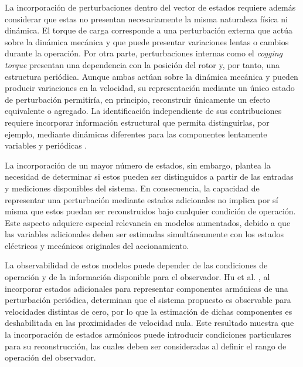 
La incorporación de perturbaciones dentro del vector de estados requiere además considerar que estas no presentan necesariamente la misma naturaleza física ni dinámica. El torque de carga corresponde a una perturbación externa que actúa sobre la dinámica mecánica y que puede presentar variaciones lentas o cambios durante la operación. Por otra parte, perturbaciones internas como el \textit{cogging torque} presentan una dependencia con la posición del rotor y, por tanto, una estructura periódica. Aunque ambas actúan sobre la dinámica mecánica y pueden producir variaciones en la velocidad, su representación mediante un único estado de perturbación permitiría, en principio, reconstruir únicamente un efecto equivalente o agregado. La identificación independiente de sus contribuciones requiere incorporar información estructural que permita distinguirlas, por ejemplo, mediante dinámicas diferentes para las componentes lentamente variables y periódicas \cite{janiszewskiExtendedKalmanFilter,huSelectivePeriodicDisturbance2022}.



La incorporación de un mayor número de estados, sin embargo, plantea la necesidad de determinar si estos pueden ser distinguidos a partir de las entradas y mediciones disponibles del sistema. En consecuencia, la capacidad de representar una perturbación mediante estados adicionales no implica por sí misma que estos puedan ser reconstruidos bajo cualquier condición de operación. Este aspecto adquiere especial relevancia en modelos aumentados, debido a que las variables adicionales deben ser estimadas simultáneamente con los estados eléctricos y mecánicos originales del accionamiento.



La observabilidad de estos modelos puede depender de las condiciones de operación y de la información disponible para el observador. Hu et al. \cite{huSelectivePeriodicDisturbance2022}, al incorporar estados adicionales para representar componentes armónicas de una perturbación periódica, determinan que el sistema propuesto es observable para velocidades distintas de cero, por lo que la estimación de dichas componentes es deshabilitada en las proximidades de velocidad nula. Este resultado muestra que la incorporación de estados armónicos puede introducir condiciones particulares para su reconstrucción, las cuales deben ser consideradas al definir el rango de operación del observador.


